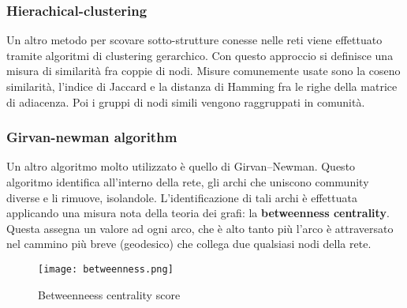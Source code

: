 \subsubsection{Hierachical-clustering}
Un altro metodo per scovare sotto-strutture conesse nelle reti viene effettuato tramite algoritmi di clustering gerarchico. Con questo approccio si definisce una misura di similarità fra coppie di nodi. Misure comunemente usate sono la coseno similarità, l’indice di Jaccard e la distanza di Hamming fra le righe della matrice di adiacenza. Poi i gruppi di nodi simili vengono raggruppati in comunità.

\subsubsection{Girvan-newman algorithm}
Un altro algoritmo molto utilizzato è quello di Girvan–Newman. Questo algoritmo identifica all’interno della rete, gli archi che uniscono community diverse e li rimuove, isolandole. L’identificazione di tali archi è effettuata applicando una misura nota della teoria dei grafi: la \textbf{betweenness centrality}. Questa assegna un valore ad ogni arco, che è alto tanto più l’arco è attraversato nel cammino più breve (geodesico) che collega due qualsiasi nodi della rete.
\begin{figure}[htb]
	\centering
	\texttt{[image: betweenness.png]}
	\caption{Betweenneess centrality score}
	\label{betweenness}
\end{figure}

